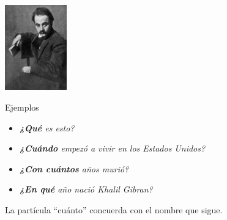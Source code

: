 \begin{question}
\begin{center}
\end{center}

\parbox{300pt}{\raggedright 
\begin{center}
	\includegraphics[width=0.2\textwidth]{NonQuestions/Figure_Slide_22.jpg}
\end{center}	
	
	}\parbox{430pt}{\raggedright \vspace*{20pt}
	
Ejemplos	

\begin{itemize}
	\item \textit{\textbf{¿Qué} es esto?}
	\item \textit{\textbf{¿Cuándo} empezó a vivir en los Estados Unidos?}
	\item \textit{\textbf{¿Con cuántos} años murió?}
	\item \textit{\textbf{¿En qué} año nació Khalil Gibran?}
\end{itemize}	
	}\vspace*{20pt}	
	
La partícula “cuánto” concuerda con el nombre que sigue.
	
\end{question}